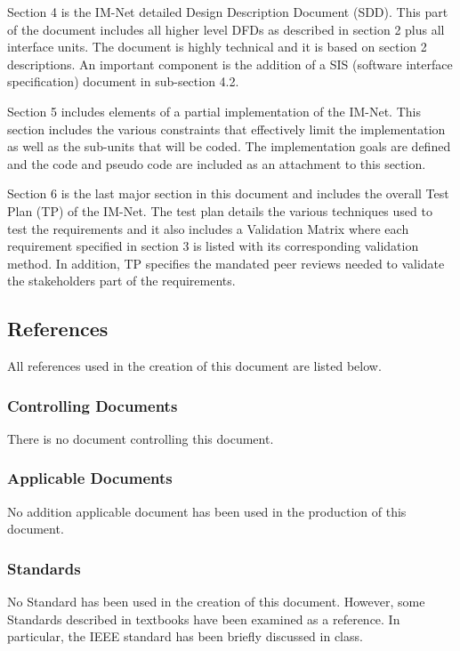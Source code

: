 \documentclass[letterpaper,12pt]{article}
\begin{document}
{Section 4 is the IM-Net detailed Design Description Document (SDD). This part of the document includes all higher level DFDs as described in section 2 plus all interface units. The document is highly technical and it is based on section 2 descriptions. An important component is the addition of a SIS (software interface specification) document in sub-section 4.2.

Section 5 includes elements of a partial implementation of the IM-Net. This section includes the various constraints that effectively limit the implementation as well as the sub-units that will be coded. The implementation goals are defined and the code and pseudo code are included as an attachment to this section.  

Section 6 is the last major section in this document and includes the overall Test Plan (TP) of the IM-Net. The test plan details the various techniques used to test the requirements and it also includes a Validation Matrix where each requirement specified in section 3 is listed with its corresponding validation method. In addition, TP specifies the mandated peer reviews needed to validate the stakeholders part of the requirements.
 
\textcolor{subsection}{\subsection{References}}

All references used in the creation of this document are listed below.

\textcolor{subsubsection}{\subsubsection{Controlling Documents}}

There is no document controlling this document.

\textcolor{subsubsection}{\subsubsection{Applicable Documents}}

No addition applicable document has been used in the production of this document.

\textcolor{subsection}{\subsubsection{Standards}}

No Standard has been used in the creation of this document. However, some Standards described in textbooks have been examined as a reference. In particular, the IEEE standard has been briefly discussed in class.

}
\end{document}
